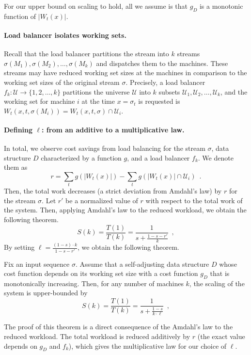 For our upper bound on scaling to hold, all we assume is that $g_D$ is a monotonic function of $|W_t(x)|$.

\paragraph*{Load balancer isolates working sets.}
Recall that the load balancer partitions the stream into $k$ streams $\sigma(M_1), \sigma(M_2), \ldots, \sigma(M_k)$ and dispatches them to the machines.
These streams may have reduced working set sizes at the machines in comparison to the working set sizes of the original stream $\sigma$.
Precisely, a load balancer $f_k : \mathcal{U} \to \{1, 2, \ldots, k\}$ partitions the universe $\mathcal{U}$ into $k$ subsets $\mathcal{U}_1, \mathcal{U}_2, \ldots, \mathcal{U}_k$, and the working set for machine $i$ at the time $x = \sigma_t$ is requested is $W_t(x, t, \sigma(M_i)) = W_t(x, t, \sigma) \cap \mathcal{U}_i$.

\paragraph*{Defining $\ell$: from an additive to a multiplicative law.}
In total, we observe cost savings from load balancing for the stream $\sigma$, data structure $D$ characterized by a function $g$, and a load balancer $f_k$. We denote them as
\[
	r = \sum_{t} g(|W_t(x)|) - \sum_{t} g(|W_t(x)| \cap \mathcal{U}_i) \enspace .
\]
Then, the total work decreases (a strict deviation from Amdahl's law) by $r$ for the stream $\sigma$. Let $r'$ be a normalized value of $r$ with respect to the total work of the system. Then, applying Amdahl's law to the reduced workload, we obtain the following theorem.
\begin{equation*}
  S(k) = \frac{T(1)}{T(k)} = \frac1{s + \frac{1-s - r'}{k}} \enspace ,
\end{equation*}
By setting $\ell = \frac{(1-s)\cdot k}{1-s-r'}$, we obtain the following theorem.

\begin{theorem}
	\label{thm:superlinear}
	Fix an input sequence $\sigma$.
	Assume that a self-adjusting data structure $D$ whose cost function depends on its working set size with a cost function $g_D$ that is monotonically increasing. 
	Then, for any number of machines $k$, the scaling of the system is upper-bounded by
	\begin{equation*}
	  S(k) = \frac{T(1)}{T(k)} = \frac1{s + \frac{1-s}{k \cdot \ell}} \enspace ,
	\end{equation*}
\end{theorem}
The proof of this theorem is a direct consequence of the Amdahl's law to the reduced workload. The total workload is reduced additively by $r$ (the exact value depends on $g_D$ and $f_k$), which gives the multiplicative law for our choice of $\ell$.


